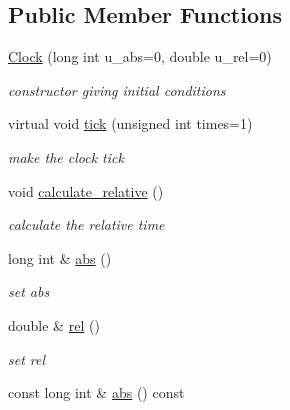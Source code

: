 \subsection*{Public Member Functions}
\begin{DoxyCompactItemize}
\item 
\hyperlink{classClock_a28d065d80392b50936715f34dfc0b1fc}{Clock} (long int u\_\-abs=0, double u\_\-rel=0)
\begin{DoxyCompactList}\small\item\em constructor giving initial conditions \end{DoxyCompactList}\item 
virtual void \hyperlink{classClock_af0ac46dd780987f2daa69d580e4d5d51}{tick} (unsigned int times=1)
\begin{DoxyCompactList}\small\item\em make the clock tick \end{DoxyCompactList}\item 
\hypertarget{classClock_aca15b58218d8e1a706cbb6217e720267}{
void \hyperlink{classClock_aca15b58218d8e1a706cbb6217e720267}{calculate\_\-relative} ()}
\label{classClock_aca15b58218d8e1a706cbb6217e720267}

\begin{DoxyCompactList}\small\item\em calculate the relative time \end{DoxyCompactList}\item 
\hypertarget{classClock_a1eedc5d52b167ee02f4fe59696bf9d62}{
long int \& \hyperlink{classClock_a1eedc5d52b167ee02f4fe59696bf9d62}{abs} ()}
\label{classClock_a1eedc5d52b167ee02f4fe59696bf9d62}

\begin{DoxyCompactList}\small\item\em set abs \end{DoxyCompactList}\item 
\hypertarget{classClock_af885542ddd8e598b0ced62edcde7f4fa}{
double \& \hyperlink{classClock_af885542ddd8e598b0ced62edcde7f4fa}{rel} ()}
\label{classClock_af885542ddd8e598b0ced62edcde7f4fa}

\begin{DoxyCompactList}\small\item\em set rel \end{DoxyCompactList}\item 
\hypertarget{classClock_a97bb93f3f1f6b6994e7a737ff88ec15d}{
const long int \& \hyperlink{classClock_a97bb93f3f1f6b6994e7a737ff88ec15d}{abs} () const }
\label{classClock_a97bb93f3f1f6b6994e7a737ff88ec15d}


\end{DoxyCompactItemize}
